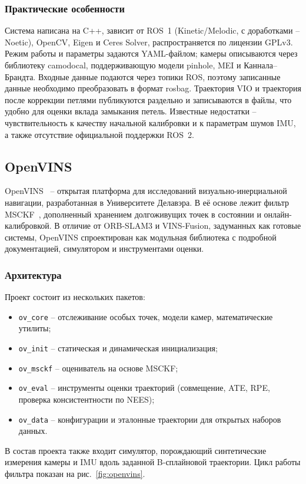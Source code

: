     \subsubsection{Практические особенности}
    Система написана на C++, зависит от ROS~1 (Kinetic/Melodic, с доработками -- Noetic), OpenCV, Eigen и Ceres Solver, распространяется по лицензии GPLv3.
    Режим работы и параметры задаются YAML-файлом; камеры описываются через библиотеку camodocal, поддерживающую модели pinhole, MEI и Каннала--Брандта.
    Входные данные подаются через топики ROS, поэтому записанные данные необходимо преобразовать в формат rosbag.
    Траектория VIO и траектория после коррекции петлями публикуются раздельно и записываются в файлы, что удобно для оценки вклада замыкания петель.
    Известные недостатки -- чувствительность к качеству начальной калибровки и к параметрам шумов IMU, а также отсутствие официальной поддержки ROS~2.

    \subsection{OpenVINS}

    OpenVINS~\cite{openvins} -- открытая платформа для исследований визуально-инерциальной навигации, разработанная в Университете Делавэра.
    В её основе лежит фильтр MSCKF~\cite{msckf}, дополненный хранением долгоживущих точек в состоянии и онлайн-калибровкой.
    В отличие от ORB-SLAM3 и VINS-Fusion, задуманных как готовые системы, OpenVINS спроектирован как модульная библиотека с подробной документацией, симулятором и инструментами оценки.

    \subsubsection{Архитектура}
    Проект состоит из нескольких пакетов:
    \begin{itemize}
        \item \texttt{ov\_core} -- отслеживание особых точек, модели камер, математические утилиты;
        \item \texttt{ov\_init} -- статическая и динамическая инициализация;
        \item \texttt{ov\_msckf} -- оцениватель на основе MSCKF;
        \item \texttt{ov\_eval} -- инструменты оценки траекторий (совмещение, ATE, RPE, проверка консистентности по NEES);
        \item \texttt{ov\_data} -- конфигурации и эталонные траектории для открытых наборов данных.
    \end{itemize}
    В состав проекта также входит симулятор, порождающий синтетические измерения камеры и IMU вдоль заданной B-сплайновой траектории.
    Цикл работы фильтра показан на рис.~\ref{fig:openvins}.

